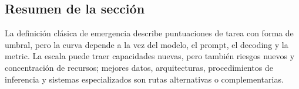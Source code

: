 
\subsection{Resumen de la sección}

La definición clásica de emergencia describe puntuaciones de tarea con forma de umbral, pero la curva depende a la vez del modelo, el prompt, el decoding y la metric. La escala puede traer capacidades nuevas, pero también riesgos nuevos y concentración de recursos; mejores datos, arquitecturas, procedimientos de inferencia y sistemas especializados son rutas alternativas o complementarias.

